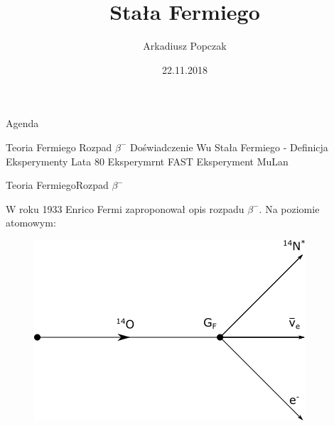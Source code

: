 \documentclass[xcolor={dvipsnames}]{beamer}
\author{Arkadiusz Popczak}
\title{Stała Fermiego}
\date{22.11.2018}
\begin{document}
\begin{frame}
    \maketitle
\end{frame}

\begin{frame}{Agenda}

    \begin{outline}[enumerate]

        \1 Teoria Fermiego
            \2 Rozpad $\beta^-$
            \2 Doświadczenie Wu
            \2 Stała Fermiego - Definicja
        \1 Eksperymenty
            \2 Lata 80
            \2 Eksperymrnt FAST
            \2 Eksperyment MuLan


    \end{outline}

\end{frame}

\begin{frame}{Teoria Fermiego}{Rozpad $\beta^-$}

    W roku 1933 Enrico Fermi \cite{fermi} zaproponował opis rozpadu $\beta^-$. Na poziomie atomowym:

    \begin{figure}

        \includegraphics[scale=0.8]{4points.png}

    \end{figure}

\end{frame}
\end{document}
